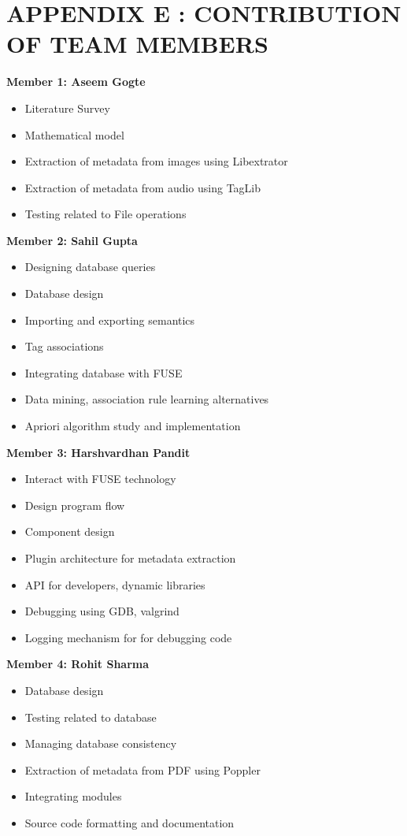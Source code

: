 \section{APPENDIX E : CONTRIBUTION OF TEAM MEMBERS} 
\noindent \textbf{Member 1: Aseem Gogte} 
\begin{itemize}
\item Literature Survey
\item Mathematical model
\item Extraction of metadata from images using Libextrator
\item Extraction of metadata from audio using TagLib
\item Testing related to File operations
\end{itemize}

\noindent \textbf{Member 2: Sahil Gupta}
\begin{itemize}
\item Designing database queries
\item Database design
\item Importing and exporting semantics
\item Tag associations
\item Integrating database with FUSE
\item Data mining, association rule learning alternatives
\item Apriori algorithm study and implementation
\end{itemize}

\noindent \textbf {Member 3: Harshvardhan Pandit} 
\begin{itemize}
\item Interact with FUSE technology
\item Design program flow
\item Component design
\item Plugin architecture for metadata extraction
\item API for developers, dynamic libraries
\item Debugging using GDB, valgrind
\item Logging mechanism for for debugging code
\end{itemize}

\noindent \textbf {Member 4: Rohit Sharma} 
\begin{itemize}
\item Database design
\item Testing related to database 
\item Managing database consistency
\item Extraction of metadata from PDF using Poppler
\item Integrating modules
\item Source code formatting and documentation
\end{itemize}

